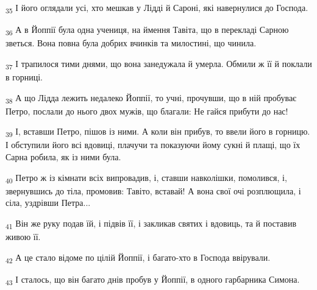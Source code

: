 \begin{tcolorbox}
\textsubscript{35} І його оглядали усі, хто мешкав у Лідді й Сароні, які навернулися до Господа.
\end{tcolorbox}
\begin{tcolorbox}
\textsubscript{36} А в Йоппії була одна учениця, на ймення Тавіта, що в перекладі Сарною зветься. Вона повна була добрих вчинків та милостині, що чинила.
\end{tcolorbox}
\begin{tcolorbox}
\textsubscript{37} І трапилося тими днями, що вона занедужала й умерла. Обмили ж її й поклали в горниці.
\end{tcolorbox}
\begin{tcolorbox}
\textsubscript{38} А що Лідда лежить недалеко Йоппії, то учні, прочувши, що в ній пробуває Петро, послали до нього двох мужів, що благали: Не гайся прибути до нас!
\end{tcolorbox}
\begin{tcolorbox}
\textsubscript{39} І, вставши Петро, пішов із ними. А коли він прибув, то ввели його в горницю. І обступили його всі вдовиці, плачучи та показуючи йому сукні й плащі, що їх Сарна робила, як із ними була.
\end{tcolorbox}
\begin{tcolorbox}
\textsubscript{40} Петро ж із кімнати всіх випровадив, і, ставши навколішки, помолився, і, звернувшись до тіла, промовив: Тавіто, вставай! А вона свої очі розплющила, і сіла, уздрівши Петра...
\end{tcolorbox}
\begin{tcolorbox}
\textsubscript{41} Він же руку подав їй, і підвів її, і закликав святих і вдовиць, та й поставив живою її.
\end{tcolorbox}
\begin{tcolorbox}
\textsubscript{42} А це стало відоме по цілій Йоппії, і багато-хто в Господа ввірували.
\end{tcolorbox}
\begin{tcolorbox}
\textsubscript{43} І сталось, що він багато днів пробув у Йоппії, в одного гарбарника Симона.
\end{tcolorbox}
